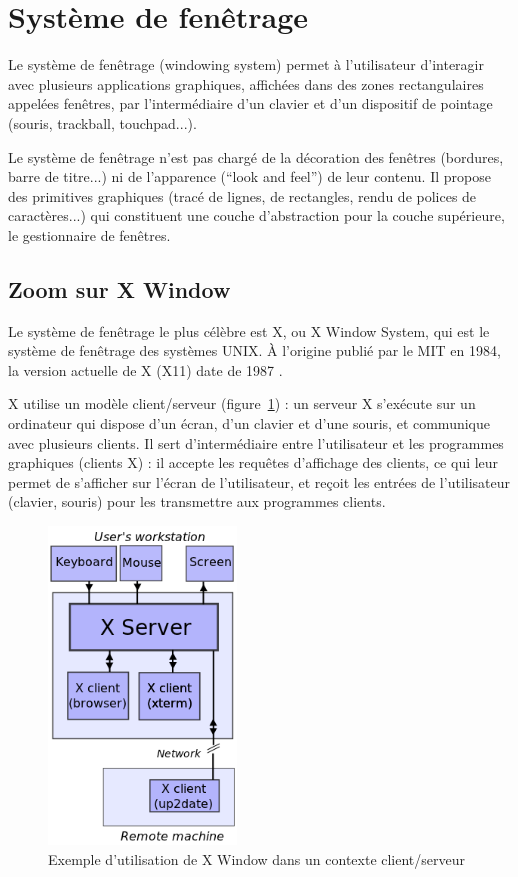\section{Système de fenêtrage}
Le système de fenêtrage (windowing system) permet à l'utilisateur d'interagir avec plusieurs applications graphiques, affichées dans des zones rectangulaires appelées fenêtres, par l'intermédiaire d'un clavier et d'un dispositif de pointage (souris, trackball, touchpad...).

Le système de fenêtrage n'est pas chargé de la décoration des fenêtres (bordures, barre de titre...) ni de l'apparence (``look and feel'') de leur contenu. Il propose des primitives graphiques (tracé de lignes, de rectangles, rendu de polices de caractères...) qui constituent une couche d'abstraction pour la couche supérieure, le gestionnaire de fenêtres.

\subsection{Zoom sur X Window}
\label{xwindow}
Le système de fenêtrage le plus célèbre est X, ou X Window System, qui est le système de fenêtrage des systèmes UNIX. À l'origine publié par le MIT en 1984, la version actuelle de X (X11) date de 1987 \cite{Gettys86} \cite{Gettys90}.

X utilise un modèle client/serveur (figure~\ref{fig:xclientserv}) : un serveur X s'exécute sur un ordinateur qui dispose d'un écran, d'un clavier et d'une souris, et communique avec plusieurs clients. Il sert d'intermédiaire entre l'utilisateur et les programmes graphiques (clients X) : il accepte les requêtes d'affichage des clients, ce qui leur permet de s'afficher sur l'écran de l'utilisateur, et reçoit les entrées de l'utilisateur (clavier, souris) pour les transmettre aux programmes clients.

\begin{figure}[H]
  \centering
    \includegraphics[width=5cm]{figures/x-client-server}
  \caption{Exemple d'utilisation de X Window dans un contexte client/serveur}
  \label{fig:xclientserv}
\end{figure}

